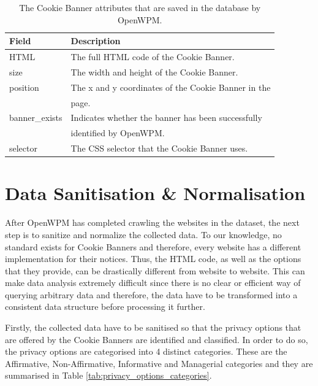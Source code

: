 \documentclass[../main.tex]{subfiles}
\begin{document}
\begin{table}[ht]
    \centering
    \begin{tabular}{@{}ll@{}}
    \toprule
        \textbf{Field} & \textbf{Description}                                   \\ \midrule
        HTML           & The full HTML code of the Cookie Banner.               \\
        size           & The width and height of the Cookie Banner.             \\
        position       & The x and y coordinates of the Cookie Banner in the    \\ 
                       & page.                                                  \\
        banner\_exists & Indicates whether the banner has been successfully     \\ 
                       & identified by OpenWPM.                                 \\
        selector       & The CSS selector that the Cookie Banner uses.          \\ \bottomrule
    \end{tabular}
    \caption{The Cookie Banner attributes that are saved in the database by OpenWPM.}
    \label{tab:methods_openwpm_fields}
\end{table}

\section{Data Sanitisation \& Normalisation}

After OpenWPM has completed crawling the websites in the dataset, the next step is to sanitize and normalize the collected data. To our knowledge, no standard exists for Cookie Banners and therefore, every website has a different implementation for their notices. Thus, the HTML code, as well as the options that they provide, can be drastically different from website to website. This can make data analysis extremely difficult since there is no clear or efficient way of querying arbitrary data and therefore, the data have to be transformed into a consistent data structure before processing it further. 

Firstly, the collected data have to be sanitised so that the privacy options that are offered by the Cookie Banners are identified and classified. In order to do so, the privacy options are categorised into 4 distinct categories. These are the Affirmative, Non-Affirmative, Informative and Managerial categories and they are summarised in Table \ref{tab:privacy_options_categories}.
\end{document}

